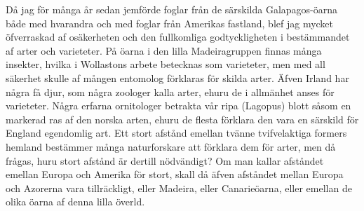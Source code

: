 Då jag för många år sedan jemförde foglar från de särskilda Galapagos-öarna både med hvarandra och med foglar från Amerikas fastland, blef jag mycket öfverraskad af osäkerheten och den fullkomliga godtyckligheten i bestämmandet af arter och varieteter. På öarna i den lilla Madeiragruppen finnas många insekter, hvilka i Wollastons arbete betecknas som varieteter, men med all säkerhet skulle af mången entomolog förklaras för skilda arter. Äfven Irland har några få djur, som några zoologer kalla arter, ehuru de i allmänhet anses för varieteter. Några erfarna ornitologer betrakta vår ripa (Lagopus) blott såsom en markerad ras af den norska arten, ehuru de flesta förklara den vara en särskild för England egendomlig art. Ett stort afstånd emellan tvänne tvifvelaktiga formers hemland bestämmer många naturforskare att förklara dem för arter, men då frågas, huru stort afstånd är dertill nödvändigt? Om man kallar afståndet emellan Europa och Amerika för stort, skall då äfven afståndet mellan Europa och Azorerna vara tillräckligt, eller Madeira, eller Canarieöarna, eller emellan de olika öarna af denna lilla överld.

